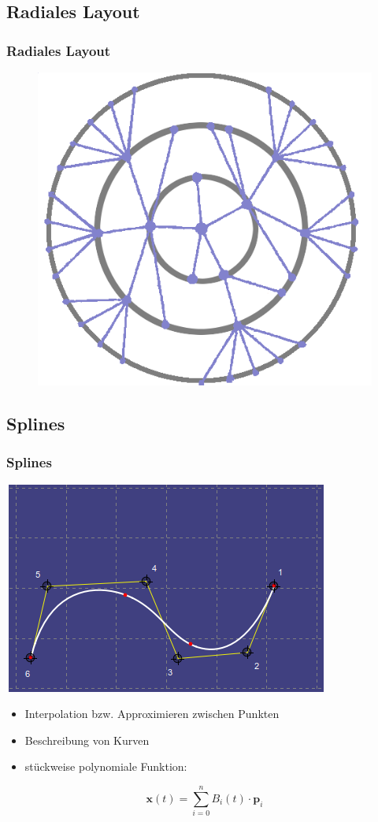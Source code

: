 \documentclass[11pt]{beamer}
\begin{document}
\subsection{Radiales Layout}
\begin{frame}
\frametitle{Radiales Layout}
\begin{figure}
\centering
\includegraphics[width=0.6\linewidth]{./RadialTree.png}
\end{figure}
\end{frame}

\subsection{Splines}
\begin{frame}
\frametitle{Splines}\centering
\includegraphics[width=0.6\linewidth]{./CreatedSpline.png}
\begin{itemize}
\item Interpolation bzw. Approximieren zwischen Punkten
\item Beschreibung von Kurven
\item stückweise polynomiale Funktion: 
\end{itemize}
\begin{equation} 
\boxed{\mathbf{x}(t) = \sum_{i = 0}^{n} B_{i}(t) \cdot \mathbf{p}_{i}}
\end{equation}
\end{frame}
\end{document}

